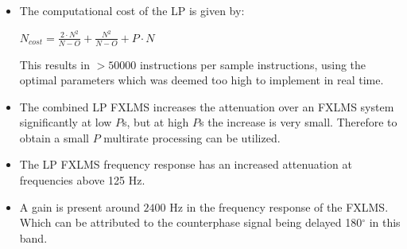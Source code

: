 \large
\begin{itemize}
\item The computational cost of the LP is given by:
\vspace{-2mm}
\begin{center}
{\large
$N_{cost}=\frac{2 \cdot N^2}{N-O}+\frac{N^2}{N-O}+P \cdot N$
}
\end{center}

	  This results in $>50000$ instructions per sample instructions, using the optimal parameters which was deemed too high to implement in real time. \\
\item The combined LP FXLMS increases the attenuation over an FXLMS system significantly at low $P$s, but at high $P$s the increase is very small. 
	  Therefore to obtain a small $P$ multirate processing can be utilized. \\ 
\item The LP FXLMS frequency response has an increased attenuation at frequencies above 125 Hz. \\
\item A gain is present around $2400$ Hz in the frequency response of the FXLMS. Which can be attributed to the counterphase signal being delayed 180$^{\circ}$ in this band.

\end{itemize}


